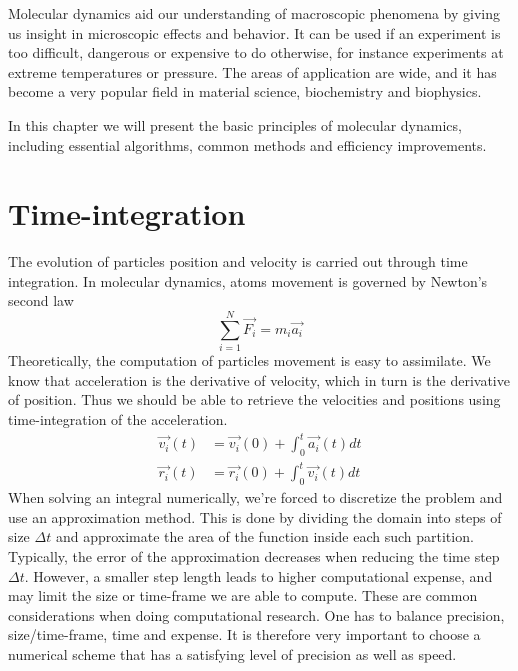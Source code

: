 \documentclass[twoside,english]{uiofysmaster}
\begin{document}
Molecular dynamics aid our understanding of macroscopic phenomena by giving us insight in microscopic effects and behavior. 
It can be used if an experiment is too difficult, dangerous or expensive to do otherwise, for instance experiments at extreme temperatures or pressure. 
The areas of application are wide, and it has become a very popular field in material science, biochemistry and biophysics.

In this chapter we will present the basic principles of molecular dynamics, including essential algorithms, common methods and efficiency improvements.


\section{Time-integration}
The evolution of particles position and velocity is carried out through time integration.
In molecular dynamics, atoms movement is governed by Newton's second law
\begin{equation}
	\sum_{i=1}^{N}\vec{F_i} = m_i\vec{a_i}
\end{equation}
Theoretically, the computation of particles movement is easy to assimilate.
We know that acceleration is the derivative of velocity, which in turn is the derivative of position.
Thus we should be able to retrieve the velocities and positions using time-integration of the acceleration.
\begin{align}
	\vec{v_i}(t) &= \vec{v_i}(0) + \int_{0}^{t}\vec{a_i}(t) dt \\
	\vec{r_i}(t) &= \vec{r_i}(0) + \int_{0}^{t}\vec{v_i}(t) dt
\end{align}
When solving an integral numerically, we're forced to discretize the problem and use an approximation method.
This is done by dividing the domain into steps of size $\Delta t$ and approximate the area of the function inside each such partition.
Typically, the error of the approximation decreases when reducing the time step $\Delta t$. 
However, a smaller step length leads to higher computational expense, and may limit the size or time-frame we are able to compute. 
These are common considerations when doing computational research. 
One has to balance precision, size/time-frame, time and expense. 
It is therefore very important to choose a numerical scheme that has a satisfying level of precision as well as speed. 
\end{document}
